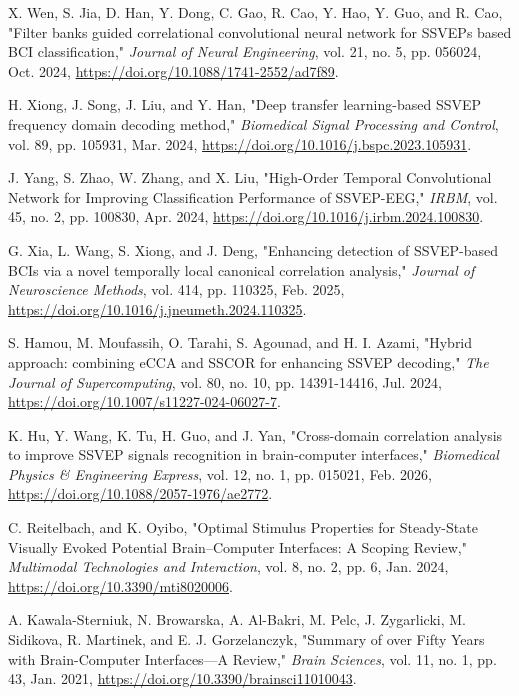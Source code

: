  X. Wen, S. Jia, D. Han, Y. Dong, C. Gao, R. Cao, Y. Hao, Y. Guo, and R. Cao, "Filter banks guided correlational convolutional neural network for SSVEPs based BCI classification," \textit{Journal of Neural Engineering}, vol. 21, no. 5, pp. 056024, Oct. 2024, \url{https://doi.org/10.1088/1741-2552/ad7f89}.

 H. Xiong, J. Song, J. Liu, and Y. Han, "Deep transfer learning-based SSVEP frequency domain decoding method," \textit{Biomedical Signal Processing and Control}, vol. 89, pp. 105931, Mar. 2024, \url{https://doi.org/10.1016/j.bspc.2023.105931}.

 J. Yang, S. Zhao, W. Zhang, and X. Liu, "High-Order Temporal Convolutional Network for Improving Classification Performance of SSVEP-EEG," \textit{IRBM}, vol. 45, no. 2, pp. 100830, Apr. 2024, \url{https://doi.org/10.1016/j.irbm.2024.100830}.

 G. Xia, L. Wang, S. Xiong, and J. Deng, "Enhancing detection of SSVEP-based BCIs via a novel temporally local canonical correlation analysis," \textit{Journal of Neuroscience Methods}, vol. 414, pp. 110325, Feb. 2025, \url{https://doi.org/10.1016/j.jneumeth.2024.110325}.

 S. Hamou, M. Moufassih, O. Tarahi, S. Agounad, and H. I. Azami, "Hybrid approach: combining eCCA and SSCOR for enhancing SSVEP decoding," \textit{The Journal of Supercomputing}, vol. 80, no. 10, pp. 14391-14416, Jul. 2024, \url{https://doi.org/10.1007/s11227-024-06027-7}.

 K. Hu, Y. Wang, K. Tu, H. Guo, and J. Yan, "Cross-domain correlation analysis to improve SSVEP signals recognition in brain-computer interfaces," \textit{Biomedical Physics \& Engineering Express}, vol. 12, no. 1, pp. 015021, Feb. 2026, \url{https://doi.org/10.1088/2057-1976/ae2772}.

 C. Reitelbach, and K. Oyibo, "Optimal Stimulus Properties for Steady-State Visually Evoked Potential Brain–Computer Interfaces: A Scoping Review," \textit{Multimodal Technologies and Interaction}, vol. 8, no. 2, pp. 6, Jan. 2024, \url{https://doi.org/10.3390/mti8020006}.

 A. Kawala-Sterniuk, N. Browarska, A. Al-Bakri, M. Pelc, J. Zygarlicki, M. Sidikova, R. Martinek, and E. J. Gorzelanczyk, "Summary of over Fifty Years with Brain-Computer Interfaces—A Review," \textit{Brain Sciences}, vol. 11, no. 1, pp. 43, Jan. 2021, \url{https://doi.org/10.3390/brainsci11010043}.

